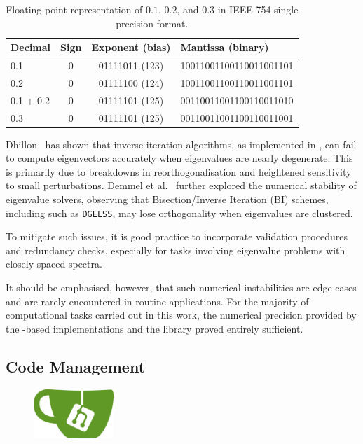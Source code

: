 \begin{table}[h]
  \centering
  \caption{Floating-point representation of $0.1$, $0.2$, and $0.3$ in IEEE 754
    single precision format.}
  \ttfamily
  \begin{tabular}{l|c|c|l}
  Decimal     & Sign & Exponent (bias) & Mantissa (binary) \\
  \hline
  0.1         & 0    & 01111011 (123)  & 10011001100110011001101 \\
  0.2         & 0    & 01111100 (124)  & 10011001100110011001101 \\
  \hline
  0.1 + 0.2   & 0    & 01111101 (125)  & 00110011001100110011010 \\
  0.3         & 0    & 01111101 (125)  & 00110011001100110011001 \\
  \end{tabular}
  \label{ieee754_fp}
\end{table}

Dhillon~\cite{Dhillon1998} has shown that inverse iteration algorithms, as
implemented in \lapack, can fail to compute eigenvectors accurately
when eigenvalues are nearly degenerate. This is primarily due to breakdowns in
reorthogonalisation and heightened sensitivity to small perturbations. Demmel et
al.~\cite{Demmel2008} further explored the numerical stability of eigenvalue
solvers, observing that Bisection/Inverse Iteration (BI) schemes, including
\subroutines such as \texttt{DGELSS}, may lose orthogonality when eigenvalues are
clustered.

To mitigate such issues, it is good practice to incorporate validation
procedures and redundancy checks, especially for tasks involving eigenvalue
problems with closely spaced spectra.

It should be emphasised, however, that such numerical instabilities are
edge cases and are rarely encountered in routine applications. For the majority
of computational tasks carried out in this work, the numerical precision
provided by the \fortran-based implementations and the \lapack library proved
entirely sufficient.

\newpage
\subsection{Code Management}

\begin{figure}
  \centering
  \includegraphics[width=0.27\textwidth]{img/Gitea_Logo.pdf}
\end{figure}

